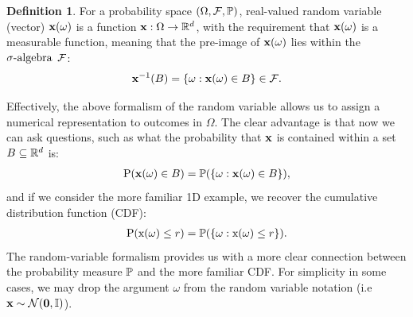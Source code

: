 \documentclass[a4paper,12pt,twoside,openright]{report}
\theoremstyle{definition}
\newtheorem{definition}{Definition}[section]
\begin{document}
\begin{definition}\label{def:random_variable}
For a probability space $\probspace$, real-valued random variable (vector) $\rvx(\omega)$ is a function $\rvx :\Omega \rightarrow \R^d$, with the requirement that $\rvx(\omega)$ is a measurable function, meaning that the pre-image of $\rvx(\omega)$  lies within the $\sigalg$ $\calF$:
\begin{align*}
    \rvx^{-1}(B)= \{\omega : \rvx(\omega) \in B \} \in \calF .
\end{align*}
\end{definition}
Effectively, the above formalism of the random variable allows us to assign a numerical representation to outcomes in $\Omega$. The clear advantage is that now we can ask questions, such as what the probability that $\rvx$ is contained within a set $B \subseteq \R^d$ is:
\begin{align*}
     \text{P}(\rvx(\omega) \in B) = \P( \{\omega : \rvx(\omega) \in B \} ),
\end{align*}
 and if we consider the more familiar 1D example, we recover the cumulative distribution function (CDF):
 \begin{align*}
     \text{P}(\rx(\omega) \leq r) = \P( \{\omega : \rx(\omega) \leq r \} ).
 \end{align*}
 The random-variable formalism provides us with a more clear connection between the probability measure $\P$ and the more familiar CDF. For simplicity in some cases, we may drop the argument $\omega$ from the random variable notation (i.e $\rvx \sim \mathcal{N}(\bm{0}, \mathbb{I})$). 
\end{document}
